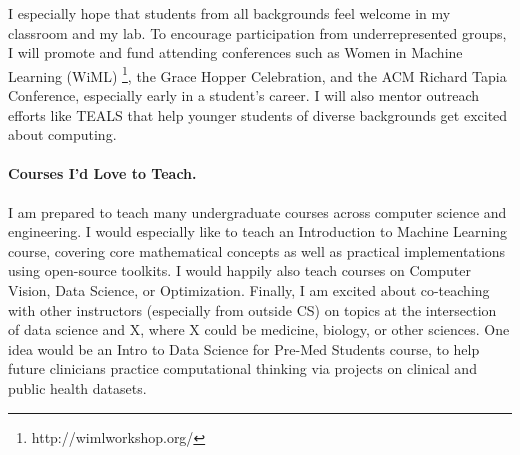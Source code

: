 \documentclass[11pt,letterpaper]{article}
\begin{document}
I especially hope that students from all backgrounds feel welcome in my classroom and my lab. To encourage participation from underrepresented groups, I will promote and fund attending conferences such as Women in Machine Learning (WiML) \footnote{http://wimlworkshop.org/}, the Grace Hopper Celebration, and the ACM Richard Tapia Conference, especially early in a student's career. I will also mentor outreach efforts like TEALS that help younger students of diverse backgrounds get excited about computing.



\paragraph{Courses I'd Love to Teach.}
I am prepared to teach many undergraduate courses across computer science and engineering. I would especially like to teach an Introduction to Machine Learning course, covering core mathematical concepts as well as practical implementations using open-source toolkits. I would happily also teach courses on Computer Vision, Data Science, or Optimization. 
Finally, I am excited about co-teaching with other instructors (especially from outside CS) on topics at the intersection of data science and X, where X could be medicine, biology, or other sciences. One idea would be an Intro to Data Science for Pre-Med Students course, to help future clinicians practice computational thinking via projects on clinical and public health datasets.
\end{document}
